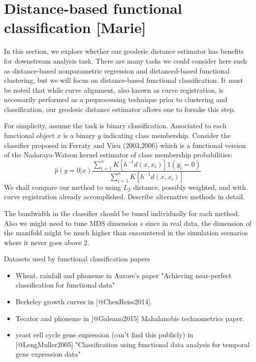 \section{Distance-based functional classification
{[}Marie{]}}\label{distance-based-functional-classification-marie}

In this section, we explore whether our geodesic distance estimator has
benefits for downstream analysis task. There are many tasks we could
consider here such as distance-based nonparametric regression and
distanced-based functional clustering, but we will focus on
distance-based functional classification. It must be noted that while
curve alignment, also known as curve registration, is necessarily
performed as a preprocessing technique prior to clustering and
classification, our geodesic distance estimator allows one to forsake
this step.

For simplicity, assume the task is binary classification. Associated to
each functional object \(x\) is a binary \(y\) indicating class
membership. Consider the classifier proposed in Ferraty and Vieu
(2003,2006) which is a functional version of the Nadaraya-Watson kernel
estimator of class membership probabilities: \[
\hat p(y = 0 | x) \frac{ \sum_{i=1}^n K[h^{-1} d(x,x_i)] 1(y_i = 0) }{ \sum_{i=1}^n K[h^{-1} d(x,x_i)] }
\] We shall compare our method to using \(L_2\) distance, possibly
weighted, and with curve registration already accomplished. Describe
alternative methods in detail.

The bandwidth in the classifier should be tuned individually for each
method. Also we might need to tune MDS dimension \(s\) since in real
data, the dimension of the manifold might be much higher than
encountered in the simulation scenarios where it never goes above 2.

Datasets used by functional classification papers

\begin{itemize}
\item Wheat, rainfall and phoneme in Aurore's paper "Achieving near-perfect classification for functional data"
\item Berkeley growth curves in [@ChenReiss2014].
\item Tecator and phoneme in [@Galeano2015] Mahalanobis technometrics paper.
\item yeast cell cycle gene expression (can't find this publicly) in [@LengMuller2005] "Classification using functional data analysis for temporal gene expression data"
\end{itemize}


